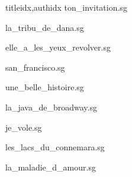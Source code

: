 \documentclass[12pt]{article}
\begin{document}
\begin{songs}{titleidx,authidx}
{ton_invitation.sg}


{la_tribu_de_dana.sg}


{elle_a_les_yeux_revolver.sg}


{san_francisco.sg}


{une_belle_histoire.sg}


{la_java_de_broadway.sg}


{je_vole.sg}


{les_lacs_du_connemara.sg}


{la_maladie_d_amour.sg}



\end{songs}
\end{document}
